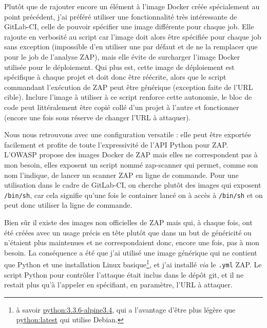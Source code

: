 Plutôt que de rajouter encore un élément à l'image Docker créée spécialement au point précédent, j'ai préféré utiliser une fonctionnalité très intéressante de GitLab-CI, celle de pouvoir spécifier une image différente pour chaque job. Elle rajoute en verbosité au script car l'image doit alors être spécifiée pour chaque job sans exception (impossible d'en utiliser une par défaut et de ne la remplacer que pour le job de l'analyse ZAP), mais elle évite de surcharger l'image Docker utilisée pour le déploiement. Qui plus est, cette image de déploiement est spécifique à chaque projet et doit donc être réécrite, alors que le script commandant l'exécution de ZAP peut être générique (exception faite de l'URL cible). Inclure l'image à utiliser à ce script renforce cette autonomie, le bloc de code peut littéralement être copié collé d'un projet à l'autre et fonctionner (encore une fois sous réserve de changer l'URL à attaquer).

Nous nous retrouvons avec une configuration versatile : elle peut être exportée facilement et profite de toute l'expressivité de l'API Python pour ZAP. L'OWASP propose des images Docker de ZAP\cite{zap_wiki_docker}\cite{zap_depot_docker} mais elles ne correspondent pas à mon besoin, elles exposent un script nommé zap-scanner qui permet, comme son nom l'indique, de lancer un scanner ZAP en ligne de commande. Pour une utilisation dans le cadre de GitLab-CI, on cherche plutôt des images qui exposent \verb|/bin/sh|, car cela signifie qu'une fois le container lancé on à accès à \verb|/bin/sh| et on peut donc utiliser la ligne de commande.

Bien sûr il existe des images non officielles de ZAP\cite{zap_maven} mais qui, à chaque fois, ont été créées avec un usage précis en tête plutôt que dans un but de généricité ou n'étaient plus maintenues et ne correspondaient donc, encore une fois, pas à mon besoin. La conséquence a été que j'ai utilisé une image générique qui ne contient que Python et une installation Linux basique\footnote{à savoir \href{https://github.com/docker-library/python/blob/d3c5f47b788adb96e69477dadfb0baca1d97f764/3.3/alpine3.4/Dockerfile}{python:3.3.6-alpine3.4}, qui a l'avantage d'être plus légère que \href{https://github.com/docker-library/python/blob/d3c5f47b788adb96e69477dadfb0baca1d97f764/3.6/jessie/Dockerfile}{python:latest} qui utilise Debian.}, et j'ai installé \textit{via} le \verb|.yml| ZAP. Le script Python pour contrôler l'attaque était inclus dans le dépôt git, et il ne restait plus qu'à l'appeler en spécifiant, en paramètre, l'URL à attaquer.

